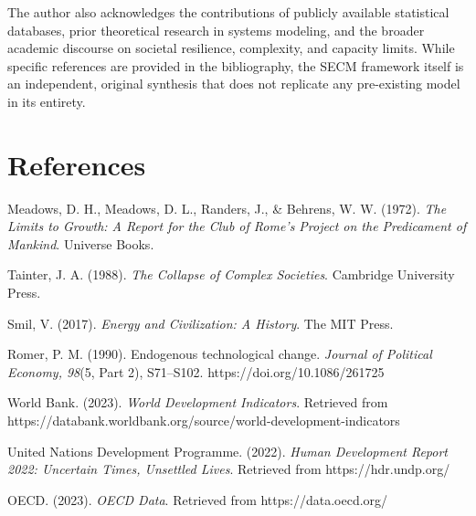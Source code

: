 \documentclass[12pt,a4paper]{article}
\begin{document}
The author also acknowledges the contributions of publicly available statistical databases, prior theoretical research in systems modeling, and the broader academic discourse on societal resilience, complexity, and capacity limits.  
While specific references are provided in the bibliography, the SECM framework itself is an independent, original synthesis that does not replicate any pre-existing model in its entirety.
\section{References}

\begin{hangparas}{0.5in}{1}

Meadows, D. H., Meadows, D. L., Randers, J., \& Behrens, W. W. (1972). \textit{The Limits to Growth: A Report for the Club of Rome's Project on the Predicament of Mankind}. Universe Books.

Tainter, J. A. (1988). \textit{The Collapse of Complex Societies}. Cambridge University Press.

Smil, V. (2017). \textit{Energy and Civilization: A History}. The MIT Press.

Romer, P. M. (1990). Endogenous technological change. \textit{Journal of Political Economy, 98}(5, Part 2), S71–S102. https://doi.org/10.1086/261725

World Bank. (2023). \textit{World Development Indicators}. Retrieved from https://databank.worldbank.org/source/world-development-indicators

United Nations Development Programme. (2022). \textit{Human Development Report 2022: Uncertain Times, Unsettled Lives}. Retrieved from https://hdr.undp.org/

OECD. (2023). \textit{OECD Data}. Retrieved from https://data.oecd.org/

\end{hangparas}
\end{document}
